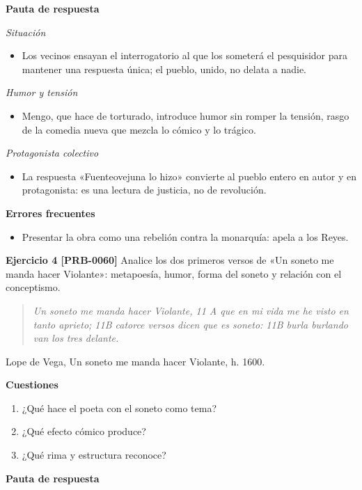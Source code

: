 \documentclass{book}
\begin{document}
\noindent\textbf{Pauta de respuesta}

\noindent\textit{Situación}
\begin{itemize}
\item Los vecinos ensayan el interrogatorio al que los someterá el pesquisidor para mantener una respuesta única; el pueblo, unido, no delata a nadie.
\end{itemize}

\noindent\textit{Humor y tensión}
\begin{itemize}
\item Mengo, que hace de torturado, introduce humor sin romper la tensión, rasgo de la comedia nueva que mezcla lo cómico y lo trágico.
\end{itemize}

\noindent\textit{Protagonista colectivo}
\begin{itemize}
\item La respuesta «Fuenteovejuna lo hizo» convierte al pueblo entero en autor y en protagonista: es una lectura de justicia, no de revolución.
\end{itemize}

\noindent\textbf{Errores frecuentes}
\begin{itemize}
\item Presentar la obra como una rebelión contra la monarquía: apela a los Reyes.
\end{itemize}

\noindent\textbf{Ejercicio 4 [PRB-0060]}
Analice los dos primeros versos de «Un soneto me manda hacer Violante»: metapoesía, humor, forma del soneto y relación con el conceptismo.


\begin{quote}
\itshape Un soneto me manda hacer Violante, 11 A que en mi vida me he visto en tanto aprieto; 11B catorce versos dicen que es soneto: 11B burla burlando van los tres delante.
\end{quote}
{\noindent\footnotesize Lope de Vega, Un soneto me manda hacer Violante, h. 1600.\par}

\noindent\textbf{Cuestiones}
\begin{enumerate}
\item ¿Qué hace el poeta con el soneto como tema?
\item ¿Qué efecto cómico produce?
\item ¿Qué rima y estructura reconoce?
\end{enumerate}

\noindent\textbf{Pauta de respuesta}
\end{document}
